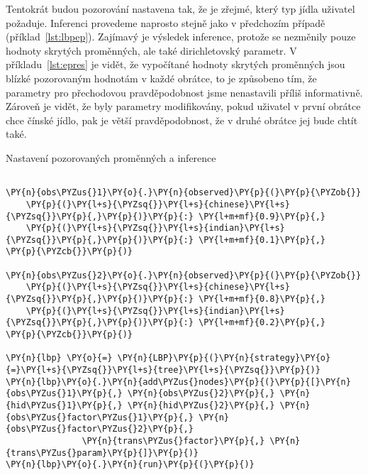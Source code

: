 Tentokrát budou pozorování nastavena tak, že je zřejmé, který typ jídla uživatel požaduje.
Inferenci provedeme naprosto stejně jako v předchozím případě (příklad~\ref{lst:lbpep}).
Zajímavý je výsledek inference, protože se nezměnily pouze hodnoty skrytých proměnných, ale také dirichletovský parametr.
V příkladu~\ref{lst:epres} je vidět, že vypočítané hodnoty skrytých proměnných jsou blízké pozorovaným hodnotám v každé obrátce, to je způsobeno tím, že parametry pro přechodovou pravděpodobnost jsme nenastavili příliš informativně.
Zároveň je vidět, že byly parametry modifikovány, pokud uživatel v první obrátce chce čínské jídlo, pak je větší pravděpodobnost, že v druhé obrátce jej bude chtít také.

\begin{example}
\caption{Nastavení pozorovaných proměnných a inference}
\label{lst:lbpep}
\begin{Verbatim}[commandchars=\\\{\}]

\PY{n}{obs\PYZus{}1}\PY{o}{.}\PY{n}{observed}\PY{p}{(}\PY{p}{\PYZob{}}
    \PY{p}{(}\PY{l+s}{\PYZsq{}}\PY{l+s}{chinese}\PY{l+s}{\PYZsq{}}\PY{p}{,}\PY{p}{)}\PY{p}{:} \PY{l+m+mf}{0.9}\PY{p}{,}
    \PY{p}{(}\PY{l+s}{\PYZsq{}}\PY{l+s}{indian}\PY{l+s}{\PYZsq{}}\PY{p}{,}\PY{p}{)}\PY{p}{:} \PY{l+m+mf}{0.1}\PY{p}{,}
\PY{p}{\PYZcb{}}\PY{p}{)}

\PY{n}{obs\PYZus{}2}\PY{o}{.}\PY{n}{observed}\PY{p}{(}\PY{p}{\PYZob{}}
    \PY{p}{(}\PY{l+s}{\PYZsq{}}\PY{l+s}{chinese}\PY{l+s}{\PYZsq{}}\PY{p}{,}\PY{p}{)}\PY{p}{:} \PY{l+m+mf}{0.8}\PY{p}{,}
    \PY{p}{(}\PY{l+s}{\PYZsq{}}\PY{l+s}{indian}\PY{l+s}{\PYZsq{}}\PY{p}{,}\PY{p}{)}\PY{p}{:} \PY{l+m+mf}{0.2}\PY{p}{,}
\PY{p}{\PYZcb{}}\PY{p}{)}

\PY{n}{lbp} \PY{o}{=} \PY{n}{LBP}\PY{p}{(}\PY{n}{strategy}\PY{o}{=}\PY{l+s}{\PYZsq{}}\PY{l+s}{tree}\PY{l+s}{\PYZsq{}}\PY{p}{)}
\PY{n}{lbp}\PY{o}{.}\PY{n}{add\PYZus{}nodes}\PY{p}{(}\PY{p}{[}\PY{n}{obs\PYZus{}1}\PY{p}{,} \PY{n}{obs\PYZus{}2}\PY{p}{,} \PY{n}{hid\PYZus{}1}\PY{p}{,} \PY{n}{hid\PYZus{}2}\PY{p}{,} \PY{n}{obs\PYZus{}factor\PYZus{}1}\PY{p}{,} \PY{n}{obs\PYZus{}factor\PYZus{}2}\PY{p}{,}
               \PY{n}{trans\PYZus{}factor}\PY{p}{,} \PY{n}{trans\PYZus{}param}\PY{p}{]}\PY{p}{)}
\PY{n}{lbp}\PY{o}{.}\PY{n}{run}\PY{p}{(}\PY{p}{)}
\end{Verbatim}
\end{example}


